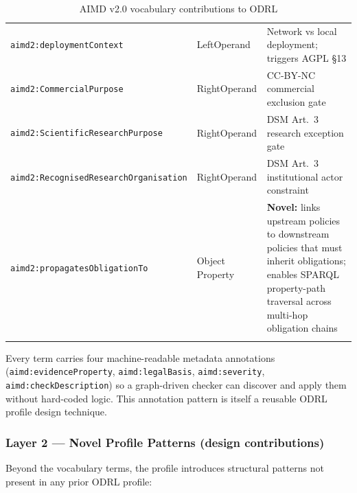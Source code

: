 \documentclass[12pt,a4paper]{article}
\begin{document}
\begin{longtable}{@{}p{5.5cm}p{2.5cm}p{6.0cm}@{}}
\texttt{aimd2:deploymentContext}    & LeftOperand & Network vs local deployment; triggers AGPL \S 13 \\[4pt]
\texttt{aimd2:CommercialPurpose}    & RightOperand & CC-BY-NC commercial exclusion gate \\
\texttt{aimd2:ScientificResearchPurpose} & RightOperand & DSM Art.\ 3 research exception gate \\
\texttt{aimd2:RecognisedResearchOrganisation} & RightOperand & DSM Art.\ 3 institutional actor constraint \\[4pt]
\texttt{aimd2:propagatesObligationTo} & Object Property & \textbf{Novel:} links upstream policies to downstream policies that must inherit obligations; enables SPARQL property-path traversal across multi-hop obligation chains \\
\bottomrule
\caption{AIMD v2.0 vocabulary contributions to ODRL}
\end{longtable}

Every term carries four machine-readable metadata annotations (\texttt{aimd:evidenceProperty}, \texttt{aimd:legalBasis}, \texttt{aimd:severity}, \texttt{aimd:checkDescription}) so a graph-driven checker can discover and apply them without hard-coded logic. This annotation pattern is itself a reusable ODRL profile design technique.

\subsubsection*{Layer 2 — Novel Profile Patterns (design contributions)}

Beyond the vocabulary terms, the profile introduces structural patterns not present in any prior ODRL profile:
\end{document}
